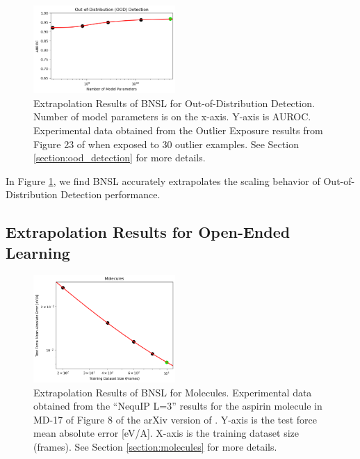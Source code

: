 \documentclass{article} %
\begin{document}
\begin{figure}[htbp]
    \centering
\includegraphics[width=0.48\textwidth]{figures/ood_detection/ood_detection.png}
    \caption{
Extrapolation Results of BNSL for Out-of-Distribution Detection. Number of model parameters is on the x-axis. Y-axis is AUROC. Experimental data obtained from the Outlier Exposure results from Figure 23 of \cite{bai2022training} when exposed to 30 outlier examples. See Section \ref{section:ood_detection} for more details.
    }
    \label{fig:ood_detection}
\end{figure}

In Figure \ref{fig:ood_detection}, we find BNSL accurately extrapolates the scaling behavior of Out-of-Distribution Detection performance.

\iffalse
\subsection{Extrapolation Results for Open-Ended Learning}
\label{section:open-ended}

\begin{figure}[htbp]
    \centering
\includegraphics[width=0.48\textwidth]{figures/molecules/molecules.png}
    \caption{
Extrapolation Results of BNSL for Molecules. Experimental data obtained from the ``NequIP L=3'' results for the aspirin molecule in MD-17 of Figure 8 of the arXiv version of \cite{Batzner_2022}. Y-axis is the test force mean absolute error [eV/A]. X-axis is the training dataset size (frames). See Section \ref{section:molecules} for more details.
    }
    \label{fig:molecules}
\end{figure}
\end{document}
